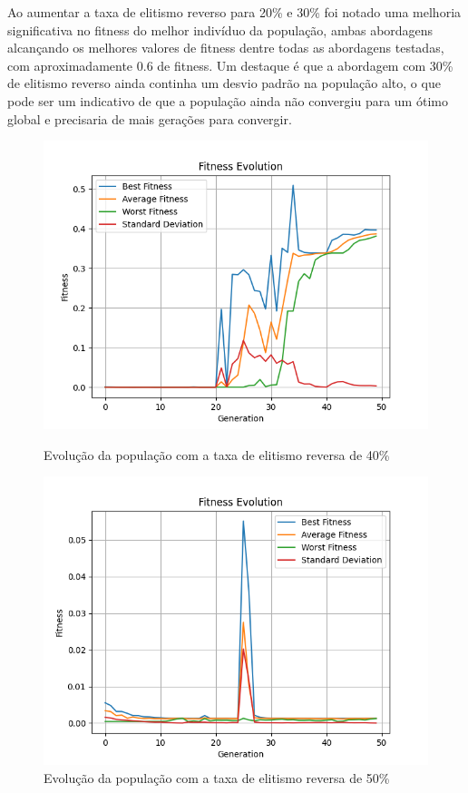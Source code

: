 \documentclass[12pt]{article}
\begin{document}
Ao aumentar a taxa de elitismo reverso para 20\% e 30\% foi notado uma melhoria significativa no fitness do melhor indivíduo da população, ambas abordagens alcançando os melhores valores de fitness dentre todas as abordagens testadas, com aproximadamente 0.6 de fitness. Um destaque é que a abordagem com 30\% de elitismo reverso ainda continha um desvio padrão na população alto, o que pode ser um indicativo de que a população ainda não convergiu para um ótimo global e precisaria de mais gerações para convergir.

\begin{figure}[h]
    \centering
    \begin{minipage}{0.45\textwidth}
        \centering
        \includegraphics[width=\linewidth]{figures/sexuado/rev_el_40.png}
        \caption{Evolução da população com a taxa de elitismo reversa de 40\%}
        \label{fig:reverse_elitism_sex_40}
    \end{minipage}\hfill
    \begin{minipage}{0.45\textwidth}
        \centering
        \includegraphics[width=\linewidth]{figures/sexuado/rev_el_50.png}
        \caption{Evolução da população com a taxa de elitismo reversa de 50\%}
        \label{fig:reverse_elitism_sex_50}
    \end{minipage}
\end{figure}
\end{document}
